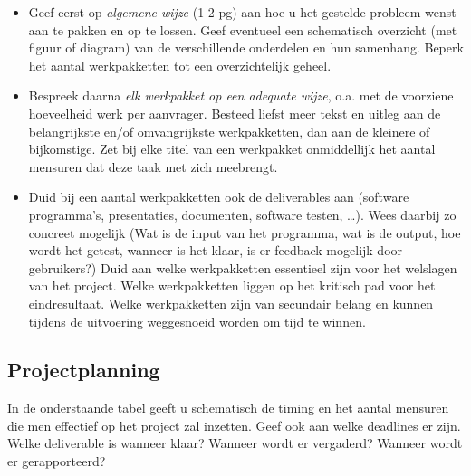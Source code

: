 \documentclass[]{book}
\begin{document}
\begin{itemize}
\item	Geef eerst op \emph{algemene wijze} (1-2 pg) aan hoe u het gestelde probleem wenst aan te pakken en op te lossen. Geef eventueel een schematisch overzicht (met figuur of diagram) van de verschillende onderdelen en hun samenhang. Beperk het aantal werkpakketten tot een overzichtelijk geheel. 

\item	Bespreek daarna \emph{elk werkpakket op een adequate wijze}, o.a. met de voorziene hoeveelheid werk per aanvrager. Besteed liefst meer tekst en uitleg aan de belangrijkste en/of omvangrijkste werkpakketten, dan aan de kleinere of bijkomstige. Zet bij elke titel van een werkpakket onmiddellijk het aantal mensuren dat deze taak met zich meebrengt. 

\item	Duid bij een aantal werkpakketten ook de deliverables aan (software programma's, presentaties, documenten, software testen, \ldots). Wees daarbij zo concreet mogelijk (Wat is de input van het programma, wat is de output, hoe wordt het getest, wanneer is het klaar, is er feedback mogelijk door gebruikers?) Duid aan welke werkpakketten essentieel zijn voor het welslagen van het project. Welke werkpakketten liggen op het kritisch pad voor het eindresultaat. Welke werkpakketten zijn van secundair belang en kunnen tijdens de uitvoering weggesnoeid worden om tijd te winnen.

\end{itemize}

\subsection{Projectplanning}\label{sec:Projectplanning}

In de onderstaande tabel geeft u schematisch de timing en het aantal mensuren die men effectief op het project zal inzetten. Geef ook aan welke deadlines er zijn. Welke deliverable is wanneer klaar? Wanneer wordt er vergaderd? Wanneer wordt er gerapporteerd?
\end{document}
